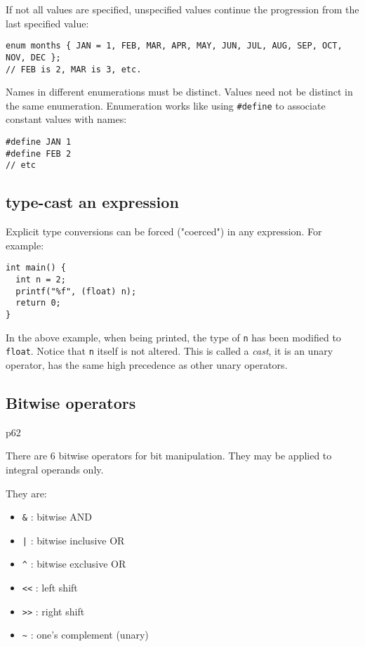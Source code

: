 \documentclass[12pt]{article}
\begin{document}
If not all values are specified, unspecified values continue the progression from the last specified value:
\begin{verbatim}
enum months { JAN = 1, FEB, MAR, APR, MAY, JUN, JUL, AUG, SEP, OCT, NOV, DEC };
// FEB is 2, MAR is 3, etc.
\end{verbatim}

Names in different enumerations must be distinct. Values need not be distinct in the same enumeration. Enumeration works like using \texttt{\#define} to associate constant values with names:
\begin{verbatim}
#define JAN 1
#define FEB 2
// etc
\end{verbatim}
\subsection{type-cast an expression}
\label{sec:org461781a}
Explicit type conversions can be forced ("coerced") in any expression. For example:
\begin{verbatim}
int main() {
  int n = 2;
  printf("%f", (float) n);
  return 0;
}
\end{verbatim}
In the above example, when being printed, the type of \texttt{n} has been modified to \texttt{float}. Notice that \texttt{n} itself is not altered. This is called a \emph{cast}, it is an unary operator, has the same high precedence as other unary operators.
\subsection{Bitwise operators}
\label{sec:orgf4cb253}
p62

There are 6 bitwise operators for bit manipulation. They may be applied to integral operands only.

They are:
\begin{itemize}
\item \texttt{\&}  : bitwise AND
\item \texttt{|}  : bitwise inclusive OR
\item \texttt{\textasciicircum{}}  : bitwise exclusive OR
\item \texttt{<<} : left shift
\item \texttt{>>} : right shift
\item \texttt{\textasciitilde{}}  : one's complement (unary)
\end{itemize}
\end{document}
